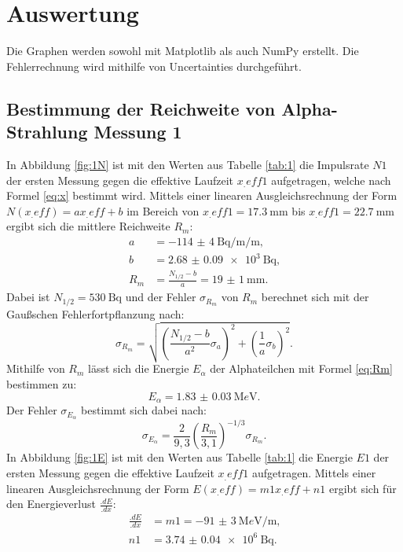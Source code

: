 \section{Auswertung}
\label{sec:Auswertung}

Die Graphen werden sowohl mit Matplotlib \cite{matplotlib} als auch NumPy \cite{numpy} erstellt. Die Fehlerrechnung wird mithilfe von Uncertainties \cite{uncertainties} durchgeführt.

\subsection{Bestimmung der Reichweite von Alpha-Strahlung Messung 1}

In Abbildung \ref{fig:1N} ist mit den Werten aus Tabelle \ref{tab:1} die Impulsrate $N1$ der ersten Messung gegen die effektive Laufzeit $x_.{eff1}$ aufgetragen, welche nach Formel \eqref{eq:x} bestimmt wird.
Mittels einer linearen Ausgleichsrechnung der Form $N(x_.{eff})=a x_.{eff} +b$ im Bereich von $x_.{eff1} = \SI{17.3}{\milli\metre}$ bis $x_.{eff1} = \SI{22.7}{\milli\metre}$ ergibt sich die mittlere Reichweite $R_m$:
\begin{align*}
a	&= \SI{-114(4)}{\becquerel\per\milli\per\metre}\text{,}\\
b	&= \SI{2.68(9)e3}{\becquerel}\text{,}\\
R_m	&= \frac{N_{1/2}-b}{a} = \SI{19(1)}{\milli\metre}\text{.}
\end{align*}
Dabei ist $N_{1/2} = \SI{530}{\becquerel}$ und der Fehler $\sigma_{R_m}$ von $R_m$ berechnet sich mit der Gaußschen Fehlerfortpflanzung nach:
\begin{equation*}
\sigma_{R_m} = \sqrt{\left(\frac{N_{1/2}-b}{a^2}\sigma_a\right)^2+\left(\frac{1}{a}\sigma_b\right)^2}\text{.}
\end{equation*} 
Mithilfe von $R_m$ lässt sich die Energie $E_\alpha$ der Alphateilchen mit Formel \eqref{eq:Rm} bestimmen zu:
\begin{equation*}
E_\alpha = \SI{1.83(3)}{\mega e\volt}\text{.}
\end{equation*} 
Der Fehler $\sigma_{E_\alpha}$ bestimmt sich dabei nach:
\begin{equation*}
\sigma_{E_\alpha} = \frac{2}{9,3}\left(\frac{R_m}{3,1}\right)^{-1/3}\sigma_{R_m}\text{.}
\end{equation*} 
In Abbildung \ref{fig:1E} ist mit den Werten aus Tabelle \ref{tab:1} die Energie $E1$ der ersten Messung gegen die effektive Laufzeit $x_.{eff1}$ aufgetragen.
Mittels einer linearen Ausgleichsrechnung der Form $E(x_.{eff})=m1 x_.{eff} +n1$ ergibt sich für den Energieverlust $\frac{.dE}{.dx}$:
\begin{align*}
\frac{.dE}{.dx}	&= m1 = \SI{-91(3)}{\mega e\volt\per\metre}\text{,}\\
n1	&= \SI{3.74(4)e6}{\becquerel}\text{.}
\end{align*}

